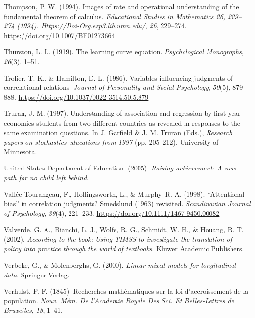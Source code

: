 \documentclass[11pt]{umnthesis}
\newlength{\cslhangindent}
\newenvironment{CSLReferences}[2] %
 {%
  \setlength{\parindent}{0pt}
  \ifodd #1 \everypar{\setlength{\hangindent}{\cslhangindent}}\ignorespaces\fi
  \ifnum #2 > 0
  \setlength{\parskip}{#2\baselineskip}
  \fi
 }%
 {}
\begin{document}
\begin{CSLReferences}{1}{0}
\leavevmode{}%
Thompson, P. W. (1994). Images of rate and operational understanding of the fundamental theorem of calculus. \emph{Educational Studies in Mathematics 26, 229--274 (1994). Https://Doi-Org.ezp3.lib.umn.edu/}, \emph{26}, 229--274. \url{https://doi.org/10.1007/BF01273664}

\leavevmode{}%
Thurston, L. L. (1919). The learning curve equation. \emph{Psychological Monographs}, \emph{26}(3), 1--51.

\leavevmode{}%
Trolier, T. K., \& Hamilton, D. L. (1986). Variables influencing judgments of correlational relations. \emph{Journal of Personality and Social Psychology}, \emph{50}(5), 879--888. \url{https://doi.org/10.1037/0022-3514.50.5.879}

\leavevmode{}%
Truran, J. M. (1997). Understanding of association and regression by first year economics students from two different countries as revealed in responses to the same examination questions. In J. Garfield \& J. M. Truran (Eds.), \emph{Research papers on stochastics educations from 1997} (pp. 205--212). University of Minnesota.

\leavevmode{}%
United States Department of Education. (2005). \emph{Raising achievement: A new path for no child left behind}.

\leavevmode{}%
Vallée-Tourangeau, F., Hollingsworth, L., \& Murphy, R. A. (1998). {``Attentional bias''} in correlation judgments? {S}medslund (1963) revisited. \emph{Scandinavian Journal of Psychology}, \emph{39}(4), 221--233. \url{https://doi.org/10.1111/1467-9450.00082}

\leavevmode{}%
Valverde, G. A., Bianchi, L. J., Wolfe, R. G., Schmidt, W. H., \& Houang, R. T. (2002). \emph{According to the book: Using {TIMSS} to investigate the translation of policy into practice through the world of textbooks}. Kluwer Academic Publishers.

\leavevmode{}%
Verbeke, G., \& Molenberghs, G. (2000). \emph{Linear mixed models for longitudinal data}. Springer Verlag.

\leavevmode{}%
Verhulst, P.-F. (1845). Recherches mathématiques sur la loi d'accroissement de la population. \emph{Nouv. Mém. De l'Academie Royale Des Sci. Et Belles-Lettres de Bruxelles}, \emph{18}, 1--41.


\end{CSLReferences}
\end{document}

